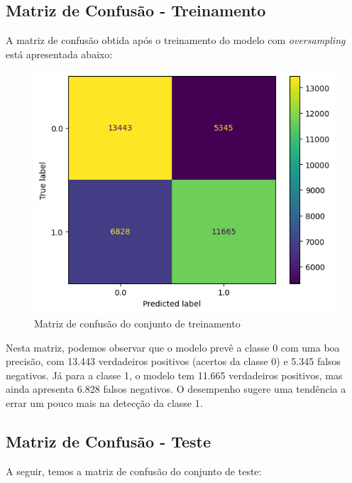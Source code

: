 \documentclass{abntpuc}
\begin{document}
\subsection*{\centering\large\textbf{Matriz de Confusão - Treinamento}}
A matriz de confusão obtida após o treinamento do modelo com \textit{oversampling} está apresentada abaixo:

\begin{figure}[H]
    \centering
    \includegraphics[width=\textwidth]{grafico11.png}
    \caption{Matriz de confusão do conjunto de treinamento}
\end{figure}

Nesta matriz, podemos observar que o modelo prevê a classe 0 com uma boa precisão, com 13.443 verdadeiros positivos (acertos da classe 0) e 5.345 falsos negativos. Já para a classe 1, o modelo tem 11.665 verdadeiros positivos, mas ainda apresenta 6.828 falsos negativos. O desempenho sugere uma tendência a errar um pouco mais na detecção da classe 1.

\subsection*{\centering\large\textbf{Matriz de Confusão - Teste}}
A seguir, temos a matriz de confusão do conjunto de teste:
\end{document}
